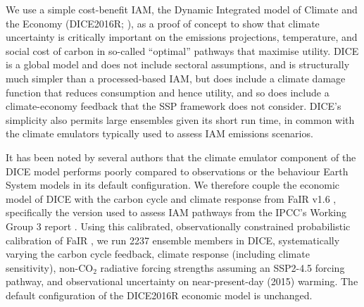 \documentclass{article}
\begin{document}
We use a simple cost-benefit IAM, the Dynamic Integrated model of Climate and the Economy (DICE2016R; \citet{Nordhaus2017}), as a proof of concept to show that climate uncertainty is critically important on the emissions projections, temperature, and social cost of carbon in so-called ``optimal'' pathways that maximise utility. DICE is a global model and does not include sectoral assumptions, and is structurally much simpler than a processed-based IAM, but does include a climate damage function that reduces consumption and hence utility, and so does include a climate-economy feedback that the SSP framework does not consider. DICE's simplicity also permits large ensembles given its short run time, in common with the climate emulators typically used to assess IAM emissions scenarios.

It has been noted by several authors \citep{Folini2021,Dietz2021,Gasser2021} that the climate emulator component of the DICE model performs poorly compared to observations or the behaviour Earth System models in its default configuration. We therefore couple the economic model of DICE with the carbon cycle and climate response from FaIR v1.6 \citep{Smith2018}, specifically the version used to assess IAM pathways from the IPCC's Working Group 3 report \citep{Riahi2022,Kikstra2022,Byers2022}. Using this calibrated, observationally constrained probabilistic calibration of FaIR \citep{Smith2021}, we run 2237 ensemble members in DICE, systematically varying the carbon cycle feedback, climate response (including climate sensitivity), non-CO$_2$ radiative forcing strengths assuming an SSP2-4.5 forcing pathway, and observational uncertainty on near-present-day (2015) warming. The default configuration of the DICE2016R economic model is unchanged.

\end{document}
